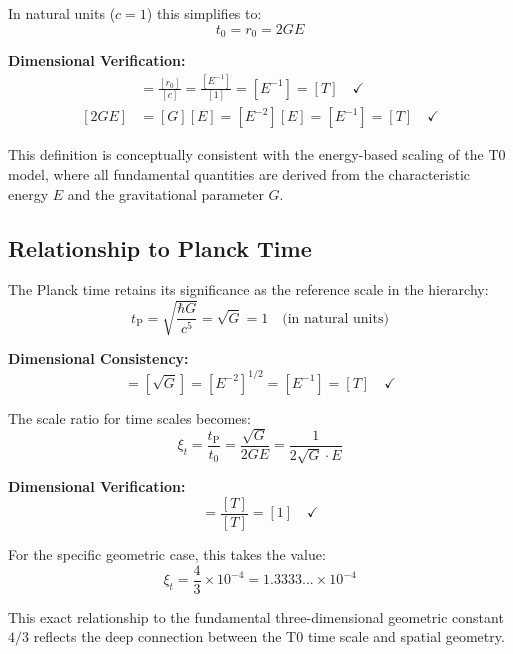 \documentclass[12pt,a4paper]{report}
\newcommand{\tP}{t_{\text{P}}}            %
\newcommand{\rzero}{r_0}                  %
\newcommand{\tzero}{t_0}                  %
\begin{document}
	In natural units ($c = 1$) this simplifies to:
	\begin{equation}
		\tzero = \rzero = 2GE
	\end{equation}
	
	\textbf{Dimensional Verification:}
	\begin{align}
		[\tzero] &= \frac{[\rzero]}{[c]} = \frac{[E^{-1}]}{[1]} = [E^{-1}] = [T] \quad \checkmark \\
		[2GE] &= [G][E] = [E^{-2}][E] = [E^{-1}] = [T] \quad \checkmark
	\end{align}
	
	This definition is conceptually consistent with the energy-based scaling of the T0 model, where all fundamental quantities are derived from the characteristic energy $E$ and the gravitational parameter $G$.
	
	\subsection{Relationship to Planck Time}
	
	The Planck time retains its significance as the reference scale in the hierarchy:
	\begin{equation}
		\tP = \sqrt{\frac{\hbar G}{c^5}} = \sqrt{G} = 1 \quad \text{(in natural units)}
	\end{equation}
	
	\textbf{Dimensional Consistency:}
	\begin{equation}
		[\tP] = [\sqrt{G}] = [E^{-2}]^{1/2} = [E^{-1}] = [T] \quad \checkmark
	\end{equation}
	
	The scale ratio for time scales becomes:
	\begin{equation}
		\xi_t = \frac{\tP}{\tzero} = \frac{\sqrt{G}}{2GE} = \frac{1}{2\sqrt{G} \cdot E}
	\end{equation}
	
	\textbf{Dimensional Verification:}
	\begin{equation}
		[\xi_t] = \frac{[T]}{[T]} = [1] \quad \checkmark
	\end{equation}
	
	For the specific geometric case, this takes the value:
	\begin{equation}
		\xi_t = \frac{4}{3} \times 10^{-4} = 1.3333... \times 10^{-4}
	\end{equation}
	
	This exact relationship to the fundamental three-dimensional geometric constant $4/3$ reflects the deep connection between the T0 time scale and spatial geometry.
	
\end{document}
